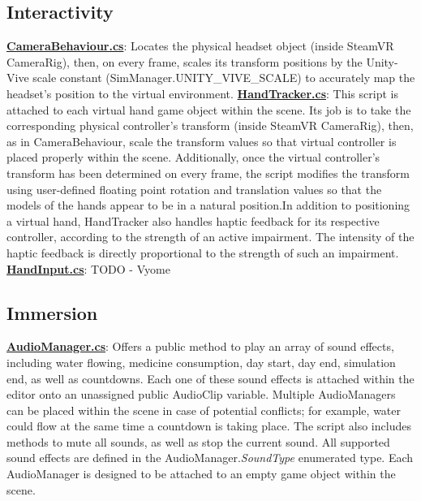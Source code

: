 \documentclass{article}
\begin{document}
\subsection*{Interactivity} %
\href{https://bit.ly/2Th9Ey3}{\textbf{CameraBehaviour.cs}}: Locates the physical headset object (inside SteamVR CameraRig), then, on every frame, scales its transform positions by the Unity-Vive scale constant (SimManager.UNITY\_VIVE\_SCALE) to accurately map the headset's position to the virtual environment. \newline \newline
\href{https://bit.ly/2U3xT7n}{\textbf{HandTracker.cs}}: This script is attached to each virtual hand game object within the scene. Its job is to take the corresponding physical controller's transform (inside SteamVR CameraRig), then, as in CameraBehaviour, scale the transform values so that virtual controller is placed properly within the scene. Additionally, once the virtual controller's transform has been determined on every frame, the script modifies the transform using user-defined floating point rotation and translation values so that the models of the hands appear to be in a natural position.\newline In addition to positioning a virtual hand, HandTracker also handles haptic feedback for its respective controller, according to the strength of an active impairment. The intensity of the haptic feedback is directly proportional to the strength of such an impairment. \newline \newline
\href{https://bit.ly/2TOMwMq}{\textbf{HandInput.cs}}: TODO - Vyome

\subsection*{Immersion} %
\href{https://bit.ly/2HHzDwj}{\textbf{AudioManager.cs}}: Offers a public method to play an array of sound effects, including water flowing, medicine consumption, day start, day end, simulation end, as well as countdowns. Each one of these sound effects is attached within the editor onto an unassigned public AudioClip variable. Multiple AudioManagers can be placed within the scene in case of potential conflicts; for example, water could flow at the same time a countdown is taking place. The script also includes methods to mute all sounds, as well as stop the current sound. All supported sound effects are defined in the AudioManager.\textit{SoundType} enumerated type. Each AudioManager is designed to be attached to an empty game object within the scene.
\end{document}
